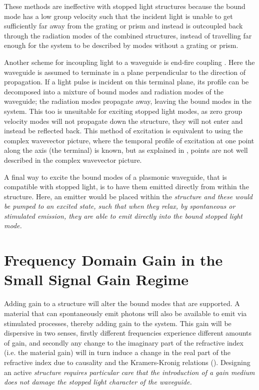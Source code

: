 These methods are ineffective with stopped light structures because the bound
mode has a low group velocity such that the incident light is unable to get
sufficiently far away from the grating or prism and instead is outcoupled back
through the radiation modes of the combined structures, instead of travelling
far enough for the system to be described by modes without a grating or prism.

Another scheme for incoupling light to a waveguide is end-fire coupling
\cite{Stegeman1983}.
Here the waveguide is assumed to terminate in a plane perpendicular to the
direction of propagation.
If a light pulse is incident on this terminal plane, its profile can be
decomposed into a mixture of bound modes and radiation modes of the waveguide;
the radiation modes propagate away, leaving the bound modes in the system.
This too is unsuitable for exciting stopped light modes, as zero group velocity
modes will not propagate down the structure, they will not enter and instead be
reflected back.
This method of excitation is equivalent to using the complex wavevector
picture, where the temporal profile of excitation at one point along the axis
(the terminal) is known, but as explained in , \zgv points
are not well described in the complex wavevector picture.

A final way to excite the bound modes of a plasmonic waveguide, that is
compatible with stopped light,
is to have them emitted directly from within the structure.
Here, an emitter would be placed within the \sl structure and these would be
pumped to an excited state, such that when they relax, by spontaneous or
stimulated emission, they are able to emit directly into the bound stopped
light mode.

\section{Frequency Domain Gain in the Small Signal Gain Regime}
\label{sec:fdGain} Adding gain to a structure will alter the bound modes that
are supported.
A material that can spontaneously emit photons will also be available to emit
via stimulated processes, thereby adding gain to the system.
This gain will be dispersive in two senses, firstly different frequencies
experience different amounts of gain, and secondly any change to the imaginary
part of the refractive index (i.e. the material gain) will in turn induce a
change in the real part of the refractive index due to causality and the
Kramers-Kronig relations ().
Designing an active \sl structure requires particular care that the introduction
of a gain medium does not damage the stopped light character of the waveguide.


